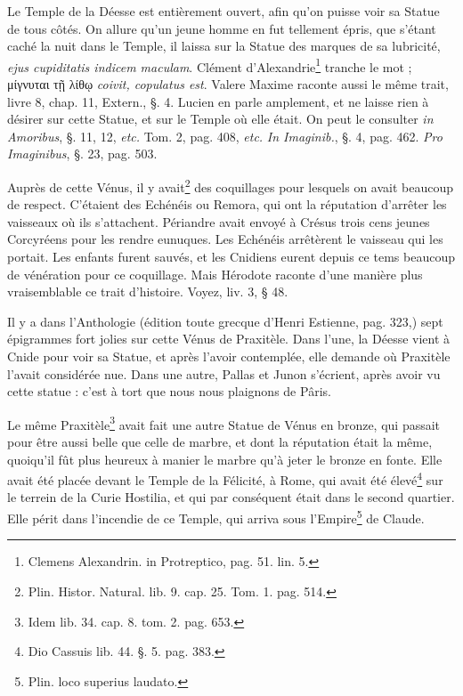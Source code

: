 \documentclass[a4paper, 11pt, oneside, polutonikogreek, french]{article}
\begin{document}
Le Temple de la Déesse est entièrement ouvert, afin qu'on puisse voir sa Statue de tous côtés. On allure qu'un jeune homme en fut tellement épris, que s'étant caché la nuit dans le Temple, il laissa sur la Statue des marques de sa lubricité, \emph{ejus cupiditatis indicem maculam}. Clément d'Alexandrie\footnote{Clemens Alexandrin. in Protreptico, pag. 51. lin. 5.} tranche le mot ; μίγνυται τῇ λίθῳ \emph{coivit, copulatus est}. Valere Maxime raconte aussi le même trait, livre 8, chap. 11, Extern., §. 4. Lucien en parle amplement, et ne laisse rien à désirer sur cette Statue, et sur le Temple où elle était. On peut le consulter \emph{in Amoribus}, §. 11, 12, \emph{etc.} Tom. 2, pag. 408, \emph{etc.} \emph{In Imaginib.}, §. 4, pag. 462. \emph{Pro Imaginibus}, §. 23, pag. 503.

Auprès de cette Vénus, il y avait\footnote{Plin. Histor. Natural. lib. 9. cap. 25. Tom. 1. pag. 514.} des coquillages pour lesquels on avait beaucoup de respect. C'étaient des Echénéis ou Remora, qui ont la réputation d'arrêter les vaisseaux où ils s'attachent. Périandre avait envoyé à Crésus trois cens jeunes Corcyréens pour les rendre eunuques. Les Echénéis arrêtèrent le vaisseau qui les portait. Les enfants furent sauvés, et les Cnidiens eurent depuis ce tems beaucoup de vénération pour ce coquillage. Mais Hérodote raconte d'une manière plus vraisemblable ce trait d'histoire. Voyez, liv. 3, § 48.

Il y a dans l'Anthologie (édition toute grecque d'Henri Estienne, pag. 323,) sept épigrammes fort jolies sur cette Vénus de Praxitèle. Dans l'une, la Déesse vient à Cnide pour voir sa Statue, et après l'avoir contemplée, elle demande où Praxitèle l'avait considérée nue. Dans une autre, Pallas et Junon s'écrient, après avoir vu cette statue : c'est à tort que nous nous plaignons de Pâris.

Le même Praxitèle\footnote{Idem lib. 34. cap. 8. tom. 2. pag. 653.} avait fait une autre Statue de Vénus en bronze, qui passait pour être aussi belle que celle de marbre, et dont la réputation était la même, quoiqu'il fût plus heureux à manier le marbre qu'à jeter le bronze en fonte. Elle avait été placée devant le Temple de la Félicité, à Rome, qui avait été élevé\footnote{Dio Cassuis lib. 44. §. 5. pag. 383.} sur le terrein de la Curie Hostilia, et qui par conséquent était dans le second quartier. Elle périt dans l'incendie de ce Temple, qui arriva sous l'Empire\footnote{Plin. loco superius laudato.} de Claude.
\end{document}
